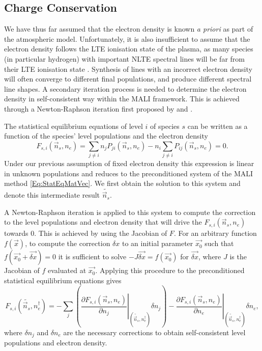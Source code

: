 \subsection{Charge Conservation}\label{Sec:ChargeCons}

We have thus far assumed that the electron density is known \emph{a priori} as part of the atmospheric model.
Unfortunately, it is also insufficient to assume that the electron density follows the LTE ionisation state of the plasma, as many species (in particular hydrogen) with important NLTE spectral lines will be far from their LTE ionisation state \citep{Heinzel1995,Paletou1995,Bjorgen2019}.
Synthesis of lines with an incorrect electron density will often converge to different final populations, and produce different spectral line shapes.
A secondary iteration process is needed to determine the electron density in self-consistent way within the MALI framework.
This is achieved through a Newton-Raphson iteration first proposed by \citet{Heinzel1995} and \citet{Paletou1995}.

The statistical equilibrium equations of level $i$ of species $s$ can be written as a function of the species' level populations and the electron density
\begin{equation}
    \label{Eq:EseFn}
    F_{s, i}(\vec{n}_s, n_e) = \sum_{j\neq i} n_j P_{ji}(\vec{n}_s, n_e) - n_i\sum_{j\neq i} P_{ij}(\vec{n}_s, n_e) = 0.
\end{equation}
Under our previous assumption of fixed electron density this expression is linear in unknown populations and reduces to the preconditioned system of the MALI method \eqref{Eq:StatEqMatVec}.
We first obtain the solution to this system and denote this intermediate result $\widetilde{\vec{n}_s}$.

A Newton-Raphson iteration is applied to this system to compute the correction to the level populations and electron density that will drive the $F_{s,i}(\vec{n}_s, n_e)$ towards 0.
This is achieved by using the Jacobian of $F$.
For an arbitrary function $f(\vec{x})$, to compute the correction $\delta x$ to an initial parameter $\vec{x_0}$ such that $f(\vec{x_0} + \vec{\delta x}) = 0$ it is sufficient to solve $-J\vec{\delta x} = f(\vec{x_0})$ for $\vec{\delta x}$, where $J$ is the Jacobian of $f$ evaluated at $\vec{x_0}$.
Applying this procedure to the preconditioned statistical equilibrium equations gives
\begin{equation}
    \label{Eq:LinNr}
    F_{s, i}(\widetilde{\vec{n}_s}, n_e^\dagger) =
    - \sum_j \left( \left.\frac{\partial F_{s,i}(\vec{n}_s, n_e)}{\partial n_j}\right\rvert_{(\widetilde{\vec{n}_s}, n_e^\dagger)} \delta n_j \right)
    - \left.\frac{\partial F_{s,i}(\vec{n}_s, n_e)}{\partial n_e}\right\rvert_{(\widetilde{\vec{n}_s}, n_e^\dagger)} \delta n_e,
\end{equation}
where $\delta n_j$ and $\delta n_e$ are the necessary corrections to obtain self-consistent level populations and electron density.


